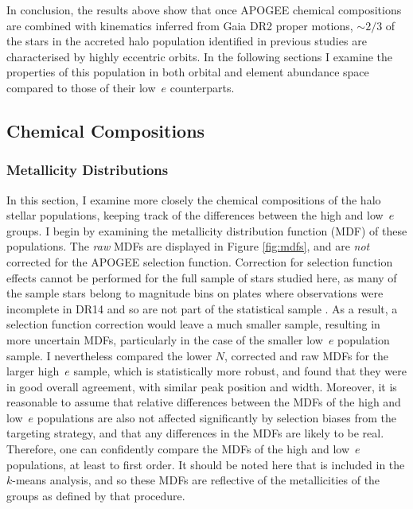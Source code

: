 In conclusion, the results above show that once APOGEE chemical
compositions are combined with kinematics inferred from Gaia DR2
proper motions, $\sim 2/3$ of the stars in the accreted halo
population identified in previous studies are characterised by
highly eccentric orbits.  In the following sections I examine
the properties of this population in both orbital and element
abundance space compared to those of their low~$e$ counterparts.

\subsection{Chemical Compositions}

\subsubsection{Metallicity Distributions} \label{sec:mdfs}

In this section, I examine more closely the chemical compositions
of the halo stellar populations, keeping track of the differences
between the high and low~$e$ groups. I begin by examining the
metallicity distribution function (MDF) of these populations.  The
{\it raw} MDFs are displayed in Figure \ref{fig:mdfs}, and are {\it
not} corrected for the APOGEE selection function. Correction for
selection function effects cannot be performed for the full sample
of stars studied here, as many of the sample stars belong to magnitude
bins on plates where observations were incomplete in DR14 and so
are not part of the statistical sample \citep[see][for details on
the selection function of APOGEE and the targeting strategy,
respectively]{2014ApJ...790..127B,2013AJ....146...81Z}. 
As a result, a selection function correction would leave a
much smaller sample, resulting in more uncertain MDFs, particularly
in the case of the smaller low~$e$ population sample.  I nevertheless
compared the lower $N$, corrected and raw MDFs for the larger
high~$e$ sample, which is statistically more robust, and found that
they were in good overall agreement, with similar peak position and
width.  Moreover, it
is reasonable to assume that relative differences between the MDFs
of the high and low~$e$ populations are also not affected significantly
by selection biases from the targeting strategy, and that any
differences in the MDFs are likely to be real. Therefore, one can
confidently compare the MDFs of the high and low~$e$ populations,
at least to first order.  It should be noted here that \feh{} is
included in the $k$-means analysis, and so these MDFs are reflective
of the metallicities of the groups as defined by that procedure.

